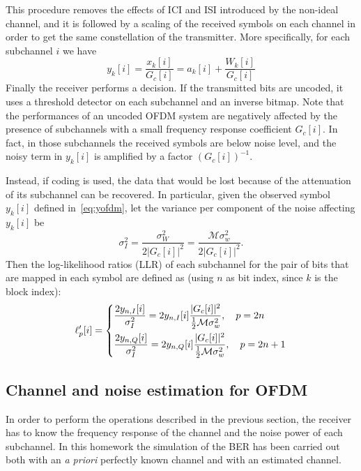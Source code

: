 \documentclass[10pt]{article}
\newcommand{\ofdM} {\mathcal{M}}
\begin{document}
This procedure removes the effects of ICI and ISI introduced by the non-ideal channel, and it is followed by a scaling of the received symbols on each channel in order to get the same constellation of the transmitter. More specifically, for each subchannel $i$ we have
\begin{equation}
	y_k[i] = \frac{x_k[i]}{G_c[i]} = a_k[i] + \frac{W_k[i]}{G_c[i]}
	\label{eq:yofdm}
\end{equation}
Finally the receiver performs a decision. If the transmitted bits are uncoded, it uses a threshold detector on each subchannel and an inverse bitmap. Note that the performances of an uncoded OFDM system are negatively affected by the presence of subchannels with a small frequency response coefficient $G_c[i]$. In fact, in those subchannels the received symbols are below noise level, and the noisy term in $y_k[i]$ is amplified by a factor $(G_c[i])^{-1}$.

Instead, if coding is used, the data that would be lost because of the attenuation of its subchannel can be recovered. In particular, given the observed symbol $y_k[i]$ defined in~\eqref{eq:yofdm}, let the variance per component of the noise affecting $y_k[i]$ be
\begin{equation}
	\sigma_I^2 = \frac{\sigma_W^2}{2 |G_c[i]|^2} = \frac{\ofdM \sigma_w^2}{2 |G_c[i]|^2}.
\end{equation}
Then the log-likelihood ratios (LLR) of each subchannel for the pair of bits that are mapped in each symbol are defined as (using $n$ as bit index, since $k$ is the block index):
\begin{equation}
\ell'_p[i] =
	\begin{dcases}
	\frac{2 y_{n,I}[i]}{\sigma_I^2} = 2 y_{n,I}[i] \frac{|G_c[i]|^2 }{\frac{1}{2} \ofdM \sigma_w^2}, \quad p = 2n \\
	\frac{2 y_{n,Q}[i]}{\sigma_I^2} = 2 y_{n,Q}[i] \frac{|G_c[i]|^2 }{\frac{1}{2} \ofdM \sigma_w^2}, \quad p = 2n+1 \\
	\end{dcases}
\label{eq:LLRofdm}
\end{equation}

\subsection*{Channel and noise estimation for OFDM}
In order to perform the operations described in the previous section, the receiver has to know the frequency response of the channel and the noise power of each subchannel. In this homework the simulation of the BER has been carried out both with an \textit{a priori} perfectly known channel and with an estimated channel. 
\end{document}
